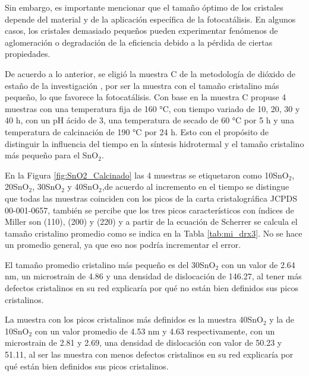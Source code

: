 \documentclass[12pt]{article}
\begin{document}
Sin embargo, es importante mencionar que el tamaño óptimo de los cristales depende del material y de la aplicación específica de la fotocatálisis. En algunos casos, los cristales demasiado pequeños pueden experimentar fenómenos de aglomeración o degradación de la eficiencia debido a la pérdida de ciertas propiedades.\vspace{1em} %

De acuerdo a lo anterior, se eligió la muestra C de la metodología de dióxido de estaño de la investigación \cite{IEEEreferencias:Ref36}, por ser la muestra con el tamaño cristalino más pequeño, lo que favorece la fotocatálisis. Con base en la muestra C propuse 4 muestras con una temperatura fija de 160 °C, con tiempo variado de 10, 20, 30 y 40 h, con un pH ácido de 3, una temperatura de secado de 60  °C por 5 h y una temperatura de calcinación de 190 °C por 24 h. Esto con el propósito de distinguir la influencia del tiempo en la síntesis hidrotermal y el tamaño cristalino más pequeño para el SnO$\displaystyle _{2}$. \vspace{1em} %

En la Figura \ref{fig:SnO2_Calcinado} las 4 muestras se etiquetaron como 10SnO$\displaystyle _{2}$, 20SnO$\displaystyle _{2}$, 30SnO$\displaystyle _{2}$ y 40SnO$\displaystyle _{2}$,de acuerdo al incremento en el tiempo se distingue que todas las muestras coinciden con los picos de la carta cristalográfica JCPDS 00-001-0657, también se percibe que los tres picos característicos con índices de Miller son (110), (200) y (220) y a partir de la ecuación de Scherrer se calcula el tamaño cristalino promedio como se indica en la Tabla \ref{tab:mi_drx3}. No se hace un promedio general, ya que eso nos podría incrementar el error. \vspace{1em} %

El tamaño promedio cristalino más pequeño es del 30SnO$\displaystyle _{2}$ con un valor de 2.64 nm, un microstrain de 4.86 y una densidad de dislocación de 146.27, al tener más defectos cristalinos en su red explicaría por qué no están bien definidos sus picos cristalinos.\vspace{1em} %

La muestra con los picos cristalinos más definidos es la muestra 40SnO$\displaystyle _{2}$ y la de 10SnO$\displaystyle _{2}$ con un valor promedio de 4.53 nm y 4.63 respectivamente, con un microstrain de 2.81 y 2.69, una densidad de dislocación con valor de 50.23 y 51.11, al ser las muestra con menos defectos cristalinos en su red explicaría por qué están bien definidos sus picos cristalinos.\vspace{1em} %
\end{document}
